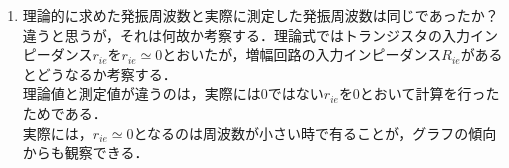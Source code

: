 \documentclass[10pt, a4j, dvipdfmx]{jarticle}
\begin{document}
\begin{enumerate}
          \item 理論的に求めた発振周波数と実際に測定した発振周波数は同じであったか？違うと思うが，それは何故か考察する．理論式ではトランジスタの入力インピーダンス$r_{ie}$を$r_{ie} \simeq 0$とおいたが，増幅回路の入力インピーダンス$R_{ie}$があるとどうなるか考察する．\\

          理論値と測定値が違うのは，実際には0ではない$r_{ie}$を0とおいて計算を行ったためである．\\
          実際には，$r_{ie} \simeq 0$となるのは周波数が小さい時で有ることが，グラフの傾向からも観察できる．\\
      \end{enumerate}
\end{document}
